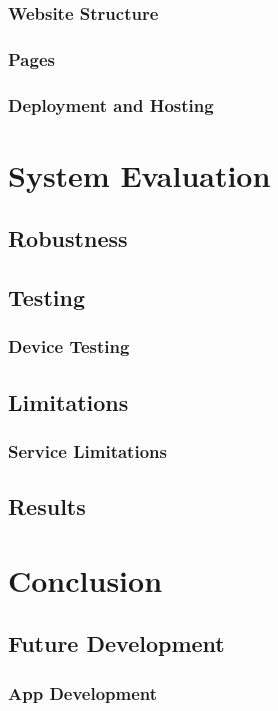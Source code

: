 \subsection{Website Structure}
\subsection{Pages}
\subsection{Deployment and Hosting}

\chapter{System Evaluation}
\section{Robustness}

\section{Testing}
\subsection{Device Testing}

\section{Limitations}
\subsection{Service Limitations}

\section{Results}

\chapter{Conclusion}
\section{Future Development}
\subsection{App Development}

